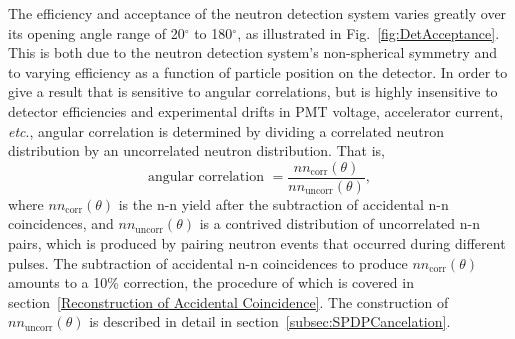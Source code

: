 
The efficiency and acceptance of the neutron detection system varies greatly over its opening angle range of 20$^{\circ}$ to 180$^{\circ}$, as illustrated in Fig.~\ref{fig:DetAcceptance}.
This is both due to the neutron detection system's non-spherical symmetry and to varying efficiency as a function of particle position on the detector.
In order to give a result that is sensitive to angular correlations, but is highly insensitive to detector efficiencies and experimental drifts in PMT voltage, accelerator current, \emph{etc}., angular correlation is determined by dividing a correlated neutron distribution by an uncorrelated neutron distribution. That is,
\begin{equation}
\label{eq:angularCorr}
\text{angular correlation }  = \frac{nn_{\text{corr}}(\theta)}{nn_{\text{uncorr}}(\theta)},
\end{equation}
where $nn_{\text{corr}}(\theta)$ is the n-n yield after the subtraction of accidental n-n coincidences, and $nn_{\text{uncorr}}(\theta)$ is a contrived distribution of uncorrelated n-n pairs, which is produced by pairing neutron events that occurred during different pulses.
The subtraction of accidental n-n coincidences to produce $nn_{\text{corr}}(\theta)$ amounts to a 10\% correction, the procedure of which is covered in section~\ref{Reconstruction of Accidental Coincidence}. The construction of $nn_{\text{uncorr}}(\theta)$ is described in detail in section~\ref{subsec:SPDPCancelation}.

